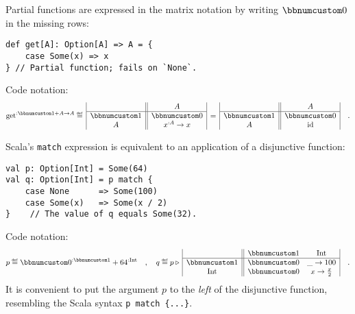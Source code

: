Partial functions are expressed in the matrix notation by writing
$\bbnum 0$ in the missing rows:
\begin{lstlisting}
def get[A]: Option[A] => A = {
    case Some(x) => x
} // Partial function; fails on `None`.
\end{lstlisting}
Code notation:
\[
\text{get}^{:\bbnum 1+A\rightarrow A}\triangleq\,\begin{array}{|c||c|}
 & A\\
\hline \bbnum 1 & \bbnum 0\\
A & x^{:A}\rightarrow x
\end{array}\,=\,\begin{array}{|c||c|}
 & A\\
\hline \bbnum 1 & \bbnum 0\\
A & \text{id}
\end{array}\quad.
\]

Scala\textsf{'}s \lstinline!match! expression is equivalent to an application
of a disjunctive function:
\begin{lstlisting}
val p: Option[Int] = Some(64)
val q: Option[Int] = p match {
    case None      => Some(100)
    case Some(x)   => Some(x / 2)
}    // The value of q equals Some(32).
\end{lstlisting}
Code notation:
\[
p\triangleq\bbnum 0^{:\bbnum 1}+64^{:\text{Int}}\quad,\quad q\triangleq p\triangleright\,\begin{array}{|c||cc|}
 & \bbnum 1 & \text{Int}\\
\hline \bbnum 1 & \bbnum 0 & \_\rightarrow100\\
\text{Int} & \bbnum 0 & x\rightarrow\frac{x}{2}
\end{array}\quad.
\]
It is convenient to put the argument $p$ to the \emph{left} of the
disjunctive function, resembling the Scala syntax \lstinline!p match {...}!.

